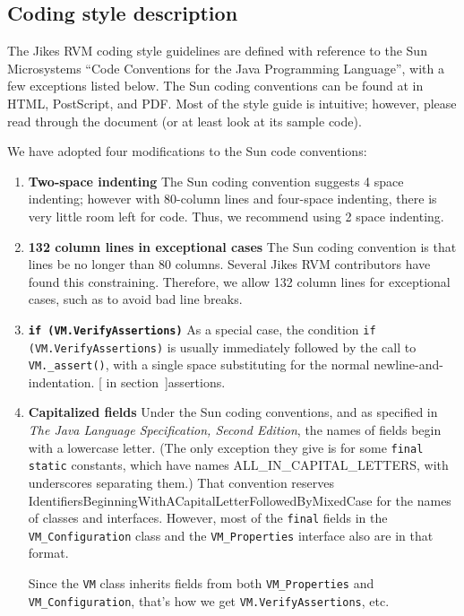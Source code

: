 \subsection{Coding style description}

The Jikes\TMweb{} RVM coding style guidelines are defined with
reference to the Sun\Rweb{} 
Microsystems ``Code Conventions for the Java\TMweb{} Programming Language'',
with a few exceptions listed below.  The Sun coding
conventions can be found at 
\xlink{{\tt \SunCodeConventionURL}} {\SunCodeConventionURL} in HTML,
PostScript, and PDF.  Most of the style guide is intuitive; 
however, please read through the document (or at least look at its sample code).

We have adopted four modifications to the Sun code conventions:
\begin{enumerate}
\item {\bf Two-space indenting} The Sun coding convention suggests 4
space indenting; however with 80-column lines and four-space indenting,
there is very little room left for code.  Thus, we recommend using 2
space indenting.

\item {\bf 132 column lines in exceptional cases} The Sun coding convention is
that lines be no longer than 80 columns.  Several Jikes RVM
contributors have found this constraining.  Therefore, we allow 132
column lines for exceptional cases, such as to avoid bad line breaks.

\item {\bf \tt if (VM.VerifyAssertions)}
As a special case, the condition {\tt if (VM.VerifyAssertions)} is
usually immediately followed by the call to {\tt VM.\_assert()},
with a single space substituting for the normal
newline-and-indentation.  [ in section~\Ref]{assertions}.    

\item {\bf Capitalized fields} 
Under the Sun coding conventions, and as specified in 
{\em The Java Language Specification, Second Edition}, the names of
fields begin with a lowercase letter.  (The only exception they give
is for some {\tt final static} constants, which have names
ALL\_IN\_CAPITAL\_LETTERS, with underscores separating them.)  That
convention reserves
IdentifiersBeginningWithACapitalLetterFollowedByMixedCase for the
names of classes and interfaces.  However, most of the {\tt final}
fields in the {\tt VM\_Configuration} class and the {\tt VM\_\-Pro\-per\-ties}
interface also are in that format.   

Since the {\tt VM} class inherits
fields from both {\tt VM\_Properties} and {\tt VM\_Configuration},
that's how we get {\tt VM.VerifyAssertions}, etc.
%

\end{enumerate}

